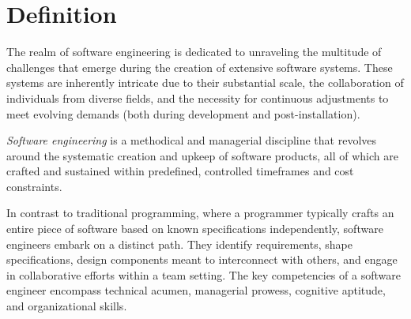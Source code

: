 \section{Definition}

The realm of software engineering is dedicated to unraveling the multitude of challenges that emerge during the creation of extensive software systems.
These systems are inherently intricate due to their substantial scale, the collaboration of individuals from diverse fields, and the necessity for continuous adjustments to meet evolving demands (both during development and post-installation). 

\begin{definition}
    \emph{Software engineering} is a methodical and managerial discipline that revolves around the systematic creation and upkeep of software products, all of which are crafted and sustained within predefined, controlled timeframes and cost constraints.
\end{definition}

In contrast to traditional programming, where a programmer typically crafts an entire piece of software based on known specifications independently, software engineers embark on a distinct path.
They identify requirements, shape specifications, design components meant to interconnect with others, and engage in collaborative efforts within a team setting. 
The key competencies of a software engineer encompass technical acumen, managerial prowess, cognitive aptitude, and organizational skills.